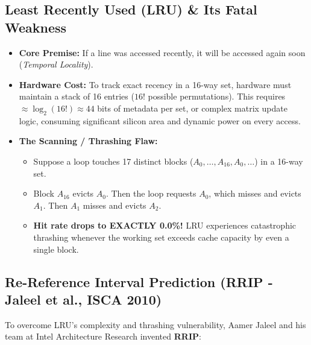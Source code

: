 \documentclass[11pt, a4paper]{article}
\begin{document}
\subsection{Least Recently Used (LRU) \& Its Fatal Weakness}
\begin{itemize}[leftmargin=1.5em]
  \item \textbf{Core Premise:} If a line was accessed recently, it will be accessed again soon (\textit{Temporal Locality}).
  \item \textbf{Hardware Cost:} To track exact recency in a 16-way set, hardware must maintain a stack of 16 entries ($16!$ possible permutations). This requires $\approx \log_2(16!) \approx 44$ bits of metadata per set, or complex matrix update logic, consuming significant silicon area and dynamic power on every access.
  \item \textbf{The Scanning / Thrashing Flaw:}
  \begin{itemize}
    \item Suppose a loop touches 17 distinct blocks ($A_0, \dots, A_{16}, A_0, \dots$) in a 16-way set.
    \item Block $A_{16}$ evicts $A_0$. Then the loop requests $A_0$, which misses and evicts $A_1$. Then $A_1$ misses and evicts $A_2$.
    \item \textbf{Hit rate drops to EXACTLY 0.0\%!} LRU experiences catastrophic thrashing whenever the working set exceeds cache capacity by even a single block.
  \end{itemize}
\end{itemize}

\subsection{Re-Reference Interval Prediction (RRIP - Jaleel et al., ISCA 2010)}
To overcome LRU's complexity and thrashing vulnerability, Aamer Jaleel and his team at Intel Architecture Research invented \textbf{RRIP}:
\end{document}

